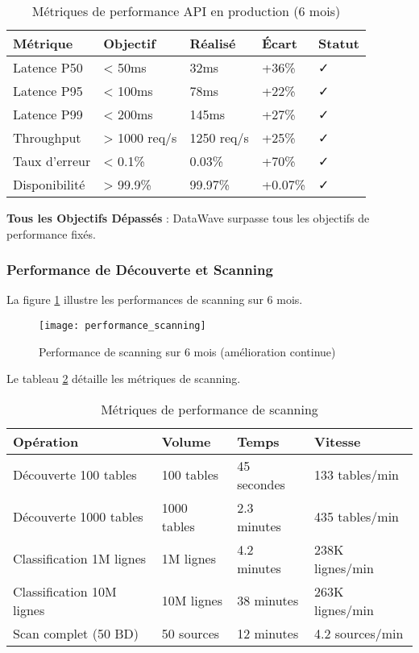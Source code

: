 \begin{table}[htpb]
\centering
\caption{Métriques de performance API en production (6 mois)}
\label{tab:performance_api_production}
\begin{tabular}{|p{}|p{}|p{}|p{}|p{}|}
\hline
\textbf{Métrique} & \textbf{Objectif} & \textbf{Réalisé} & \textbf{Écart} & \textbf{Statut} \\
\hline
Latence P50 & < 50ms & 32ms & +36\% & ✓ \\
\hline
Latence P95 & < 100ms & 78ms & +22\% & ✓ \\
\hline
Latence P99 & < 200ms & 145ms & +27\% & ✓ \\
\hline
Throughput & > 1000 req/s & 1250 req/s & +25\% & ✓ \\
\hline
Taux d'erreur & < 0.1\% & 0.03\% & +70\% & ✓ \\
\hline
Disponibilité & > 99.9\% & 99.97\% & +0.07\% & ✓ \\
\hline
\end{tabular}
\end{table}

\textbf{Tous les Objectifs Dépassés} : DataWave surpasse tous les objectifs de performance fixés.

\subsubsection{Performance de Découverte et Scanning}

La figure \ref{fig:performance_scanning} illustre les performances de scanning sur 6 mois.

\begin{figure}[htpb]
\centering
\texttt{[image: performance\_scanning]}
\caption{Performance de scanning sur 6 mois (amélioration continue)}
\label{fig:performance_scanning}
\end{figure}

Le tableau \ref{tab:performance_scanning} détaille les métriques de scanning.

\begin{table}[htpb]
\centering
\caption{Métriques de performance de scanning}
\label{tab:performance_scanning}
\begin{tabular}{|p{}|p{}|p{}|p{}|}
\hline
\textbf{Opération} & \textbf{Volume} & \textbf{Temps} & \textbf{Vitesse} \\
\hline
Découverte 100 tables & 100 tables & 45 secondes & 133 tables/min \\
\hline
Découverte 1000 tables & 1000 tables & 2.3 minutes & 435 tables/min \\
\hline
Classification 1M lignes & 1M lignes & 4.2 minutes & 238K lignes/min \\
\hline
Classification 10M lignes & 10M lignes & 38 minutes & 263K lignes/min \\
\hline
Scan complet (50 BD) & 50 sources & 12 minutes & 4.2 sources/min \\
\hline
\end{tabular}
\end{table}

